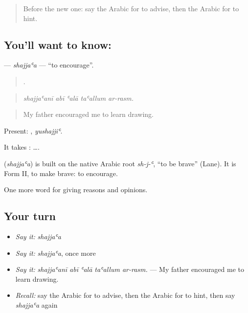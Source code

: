 \label{lesson:AR-C369-shajjaa}



\begin{quote}
Before the new one: say the Arabic for to advise, then the Arabic for to hint.
\end{quote}

\subsection*{You'll want to know: }
\textbf{} — \emph{shajjaʿa} — \textquotedblleft{}to encourage\textquotedblright{}.

\begin{quote}
    .
\end{quote}

\begin{quote}
\emph{shajjaʿanī abī ʿalā taʿallum ar-rasm.}
\end{quote}

\begin{quote}
My father encouraged me to learn drawing.
\end{quote}

Present: , \emph{yushajjiʿ}.

It takes :   ….

\begin{cousinweb}
\textbf{} (\emph{shajjaʿa}) is built on the native Arabic root \emph{sh-j-ʿ}, \textquotedblleft{}to be brave\textquotedblright{} (Lane). It is Form II, to make brave: to encourage.
\end{cousinweb}

\begin{grammarlens}[title={What you've built}]
One more word for giving reasons and opinions.
\end{grammarlens}

\subsection*{Your turn}
\begin{itemize}
\raggedright
  \item \emph{Say it:} \emph{shajjaʿa}
  \item \emph{Say it:} \emph{shajjaʿa}, once more
  \item \emph{Say it:} \emph{shajjaʿanī abī ʿalā taʿallum ar-rasm.} — My father encouraged me to learn drawing.
  \item \emph{Recall:} say the Arabic for to advise, then the Arabic for to hint, then say \emph{shajjaʿa} again
\end{itemize}

